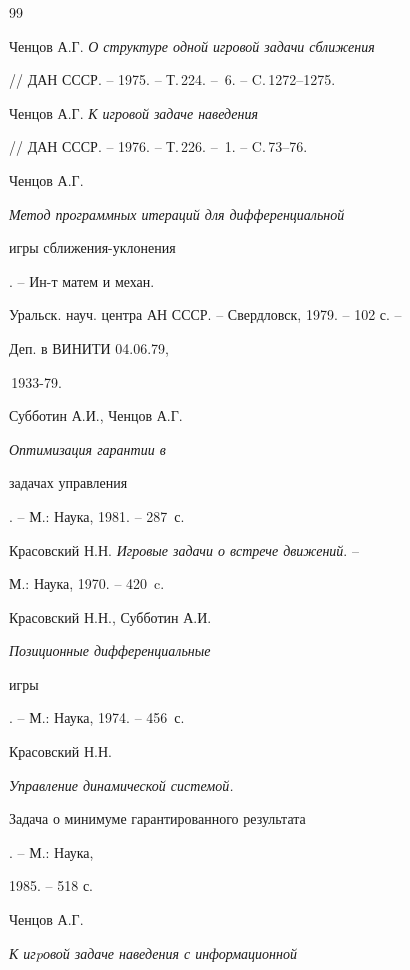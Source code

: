 \begin{thebibliography}{99}





 Ченцов А.Г. {\em О структуре одной игровой задачи сближения}


// ДАН СССР. -- 1975. -- Т.\,224. -- \No\,6. -- C.\,1272--1275.





 Ченцов А.Г. {\em К игровой задаче наведения}


// ДАН СССР. -- 1976. -- Т.\,226. -- \No\,1. -- C.\,73--76.





 Ченцов А.Г. {\em Метод программных итераций для дифференциальной


игры сближения-уклонения}. -- Ин-т матем и механ.


Уральск. науч. центра АН СССР. -- Свердловск, 1979. -- 102 с. --


Деп. в ВИНИТИ 04.06.79,


\No\,1933-79.





 Субботин А.И., Ченцов А.Г. {\em Оптимизация гарантии в


задачах управления}. -- М.: Наука, 1981. -- 287~с.





 Красовский Н.Н. {\em Игровые задачи о встрече движений}. --


М.: Наука, 1970. -- 420~c.





 Красовский Н.Н., Субботин А.И. {\em Позиционные дифференциальные


игры}. -- М.: Наука, 1974. -- 456~с.





 Красовский Н.Н. {\em Управление динамической системой.


Задача о минимуме гарантированного результата}. -- М.: Наука,


1985. -- 518 с.





 Ченцов А.Г. {\em К игpовой задаче наведения с информационной


}
\end{thebibliography}
